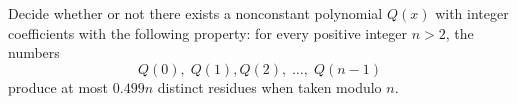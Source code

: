 Decide whether or not there exists a nonconstant polynomial $Q(x)$ with integer coefficients with the following property: for every positive integer $n > 2$, the numbers \[ Q(0), \; Q(1), Q(2),  \; \dots, \; Q(n-1) \] produce at most $0.499n$ distinct residues when taken modulo $n$.